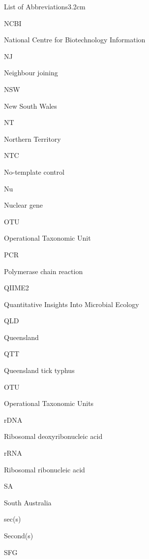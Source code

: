 \documentclass[a4paper, nobind]{templates/ociamthesis}
\begin{document}
\begin{romanpages}
\begin{mclistof}{List of Abbreviations}{3.2cm}
\item[NCBI]

National Centre for Biotechnology Information

\item[NJ]

Neighbour joining

\item[NSW]

New South Wales

\item[NT]

Northern Territory

\item[NTC]

No-template control

\item[Nu]

Nuclear gene

\item[OTU]

Operational Taxonomic Unit

\item[PCR]

Polymerase chain reaction

\item[QIIME2]

Quantitative Insights Into Microbial Ecology

\item[QLD]

Queensland

\item[QTT]

Queensland tick typhus

\item[OTU]

Operational Taxonomic Units

\item[rDNA]

Ribosomal deoxyribonucleic acid

\item[rRNA]

Ribosomal ribonucleic acid

\item[SA]

South Australia

\item[sec(s)]

Second(s)

\item[SFG]


\end{mclistof}
\end{romanpages}
\end{document}
